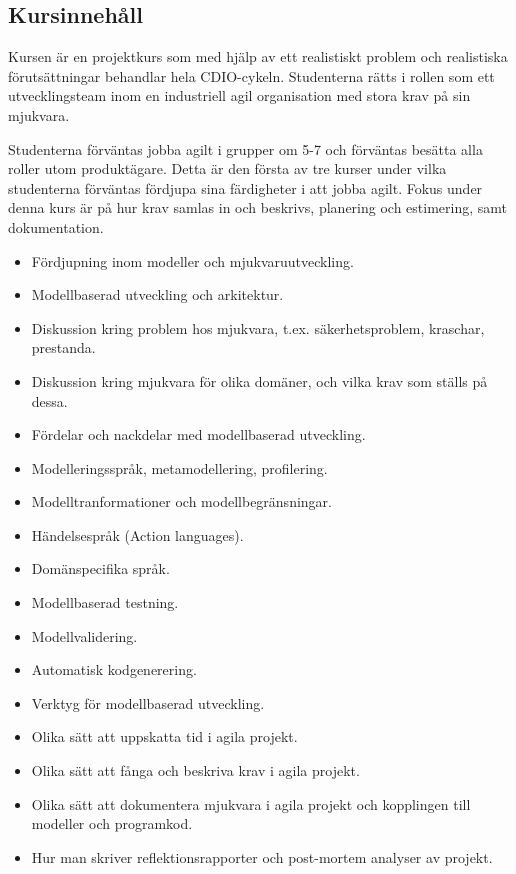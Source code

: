 \subsection*{Kursinnehåll}

Kursen är en projektkurs som med hjälp av ett realistiskt problem och
realistiska förutsättningar behandlar hela CDIO-cykeln. Studenterna
rätts i rollen som ett utvecklingsteam inom en industriell agil
organisation med stora krav på sin mjukvara.

Studenterna förväntas jobba agilt i grupper om 5-7 och förväntas besätta
alla roller utom produktägare. Detta är den första av tre kurser under
vilka studenterna förväntas fördjupa sina färdigheter i att jobba agilt.
Fokus under denna kurs är på hur krav samlas in och beskrivs, planering
och estimering, samt dokumentation.

\begin{itemize}
\tightlist
\item
  Fördjupning inom modeller och mjukvaruutveckling.
\item
  Modellbaserad utveckling och arkitektur.
\item
  Diskussion kring problem hos mjukvara, t.ex. säkerhetsproblem,
  kraschar, prestanda.
\item
  Diskussion kring mjukvara för olika domäner, och vilka krav som ställs
  på dessa.
\item
  Fördelar och nackdelar med modellbaserad utveckling.
\item
  Modelleringsspråk, metamodellering, profilering.
\item
  Modelltranformationer och modellbegränsningar.
\item
  Händelsespråk (Action languages).
\item
  Domänspecifika språk.
\item
  Modellbaserad testning.
\item
  Modellvalidering.
\item
  Automatisk kodgenerering.
\item
  Verktyg för modellbaserad utveckling.
\item
  Olika sätt att uppskatta tid i agila projekt.
\item
  Olika sätt att fånga och beskriva krav i agila projekt.
\item
  Olika sätt att dokumentera mjukvara i agila projekt och kopplingen
  till modeller och programkod.
\item
  Hur man skriver reflektionsrapporter och post-mortem analyser av
  projekt.
\end{itemize}


